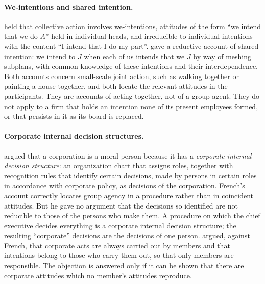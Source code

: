 \documentclass{situationist-preprint}
\begin{document}
\paragraph{We-intentions and shared intention.} \citet{Searle1990} held that collective action involves we-intentions, attitudes of the form \enquote{we intend that we do $A$} held in individual heads, and irreducible to individual intentions with the content \enquote{I intend that I do my part}. \citet{Bratman2014} gave a reductive account of shared intention: we intend to $J$ when each of us intends that we $J$ by way of meshing subplans, with common knowledge of these intentions and their interdependence. Both accounts concern small-scale joint action, such as walking together or painting a house together, and both locate the relevant attitudes in the participants. They are accounts of acting together, not of a group agent. They do not apply to a firm that holds an intention none of its present employees formed, or that persists in it as its board is replaced.

\paragraph{Corporate internal decision structures.} \citet{French1979} argued that a corporation is a moral person because it has a \emph{corporate internal decision structure}: an organization chart that assigns roles, together with recognition rules that identify certain decisions, made by persons in certain roles in accordance with corporate policy, as decisions of the corporation. French's account correctly locates group agency in a procedure rather than in coincident attitudes. But he gave no argument that the decisions so identified are not reducible to those of the persons who make them. A procedure on which the chief executive decides everything is a corporate internal decision structure; the resulting \enquote{corporate} decisions are the decisions of one person. \citet{Velasquez1983} argued, against French, that corporate acts are always carried out by members and that intentions belong to those who carry them out, so that only members are responsible. The objection is answered only if it can be shown that there are corporate attitudes which no member's attitudes reproduce.
\end{document}

